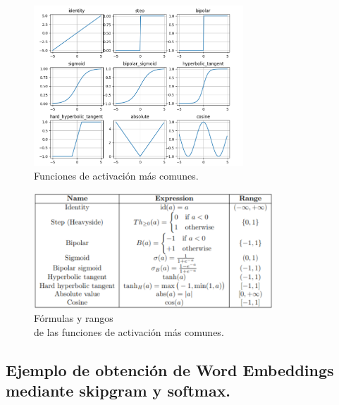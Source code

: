 \documentclass[12pt,a4paper]{article}
\begin{document}
\begin{sloppypar}
\begin{figure}[H]    %
 \centering
 \includegraphics[width=0.7\textwidth]{images/ANN/7-ANN.png}
 \caption{Funciones de activación más comunes\cite{ANN_22}.} 
 \label{fig:ann_7}
\end{figure}

\begin{figure}[H]    %
 \centering
 \includegraphics[width=0.8\textwidth]{images/ANN/8-ANN.png}
 \caption[Fórmulas y rangos de las funciones de activación más comunes.]{Fórmulas y rangos\\ de las funciones de activación más comunes\protect\footnotemark \cite{ANN_22}.}
 \label{fig:ann_8}
\end{figure}


\cleardoublepage

\subsection{Ejemplo de obtención de Word Embeddings mediante skipgram y softmax.}\label{anexo_word_emb}


\end{sloppypar}
\end{document}
